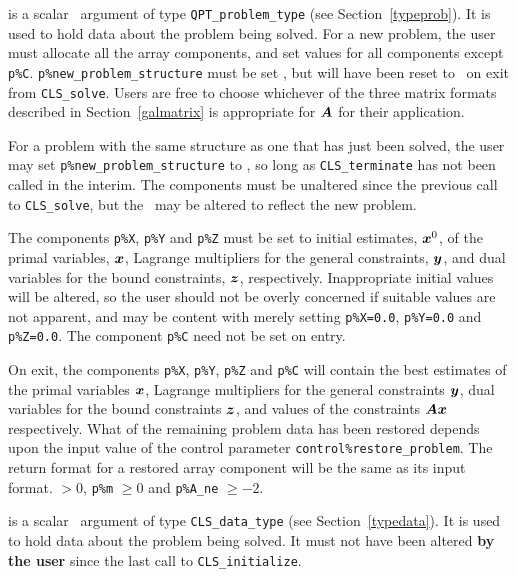 \documentclass{galahad}
\newcommand{\packagename}{CLS}
\begin{document}
\vspace*{-3mm}
\begin{description}
 is a scalar \intentinout\ argument of type 
{\tt QPT\_problem\_type}
(see Section~\ref{typeprob}). 
It is used to hold data about the problem being solved.
For a new problem, the user must allocate all the array components,
and set values for all components except {\tt p\%C}.
{\tt p\%new\_problem\_structure} must be set \true, but will have been reset
to \false\ on exit from {\tt \packagename\_solve}.
Users are free to choose whichever
of the three matrix formats described in Section~\ref{galmatrix} 
is appropriate for ${\bm{A}}$ for their application.

For a problem with the same structure as one that has just been 
solved, the user may set {\tt p\%new\_problem\_str\-u\-cture} to \false,
so long as {\tt \packagename\_terminate} has not been called in the interim.
The \integer components must be unaltered since the
previous call to {\tt \packagename\_solve}, but the \realdp\ 
may be altered to reflect the new problem.

The components {\tt p\%X}, {\tt p\%Y} and {\tt p\%Z}
must be set to initial estimates, ${\bm{x}}^{0}$, of the primal variables, 
${\bm{x}}$, Lagrange multipliers for the general constraints, ${\bm{y}}$, 
and dual variables for the bound constraints, ${\bm{z}}$, respectively.
Inappropriate initial values will be altered, so the user should
not be overly concerned if suitable values are not apparent, and may be
content with merely setting {\tt p\%X=0.0},
{\tt p\%Y=0.0} and {\tt p\%Z=0.0}.
The component {\tt p\%C} need not be set on entry.

On exit, the components {\tt p\%X}, {\tt p\%Y}, {\tt p\%Z} and {\tt p\%C}
will contain the best estimates of the primal variables ${\bm{x}}$, 
Lagrange multipliers for the general
constraints ${\bm{y}}$, dual variables for the bound constraints ${\bm{z}}$, 
and values of the constraints ${\bm{A}} {\bm{x}}$ respectively.
What of the remaining problem data has been restored depends upon
the input value of the control parameter {\tt control\%restore\_problem}.
The return format for a restored array component will be the same as its
input format.
 $> 0$, {\tt p\%m} $\geq 0$ and {\tt p\%A\_ne} 
              $\geq -2$.

 is a scalar \intentinout\ argument of type 
{\tt \packagename\_data\_type}
(see Section~\ref{typedata}). It is used to hold data about the problem being 
solved. It must not have been altered {\bf by the user} since the last call to 
{\tt \packagename\_initialize}.


\end{description}
\end{document}
